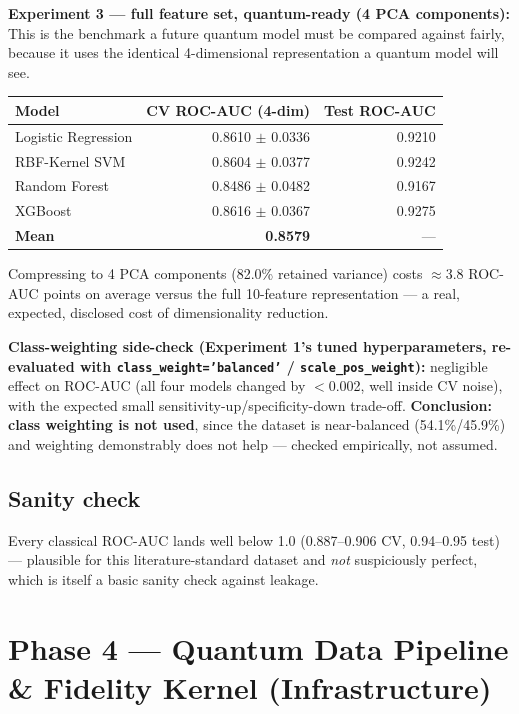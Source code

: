 \documentclass[11pt,a4paper]{article}
\newcommand{\code}[1]{\texttt{\small #1}}
\begin{document}
\textbf{Experiment 3 --- full feature set, quantum-ready (4 PCA components):} This is the benchmark a future quantum model must be compared against fairly, because it uses the identical 4-dimensional representation a quantum model will see.
\begin{center}
\begin{tabular}{@{}lrr@{}}
\toprule
\textbf{Model} & \textbf{CV ROC-AUC (4-dim)} & \textbf{Test ROC-AUC} \\
\midrule
Logistic Regression & 0.8610 $\pm$ 0.0336 & 0.9210 \\
RBF-Kernel SVM & 0.8604 $\pm$ 0.0377 & 0.9242 \\
Random Forest & 0.8486 $\pm$ 0.0482 & 0.9167 \\
XGBoost & 0.8616 $\pm$ 0.0367 & 0.9275 \\
\midrule
\textbf{Mean} & \textbf{0.8579} & --- \\
\bottomrule
\end{tabular}
\end{center}
Compressing to 4 PCA components (82.0\% retained variance) costs $\approx$3.8 ROC-AUC points on average versus the full 10-feature representation --- a real, expected, disclosed cost of dimensionality reduction.

\textbf{Class-weighting side-check (Experiment 1's tuned hyperparameters, re-evaluated with \code{class\_weight='balanced'} / \code{scale\_pos\_weight}):} negligible effect on ROC-AUC (all four models changed by $<$0.002, well inside CV noise), with the expected small sensitivity-up/specificity-down trade-off. \textbf{Conclusion: class weighting is not used}, since the dataset is near-balanced (54.1\%/45.9\%) and weighting demonstrably does not help --- checked empirically, not assumed.

\subsection{Sanity check}
Every classical ROC-AUC lands well below 1.0 (0.887--0.906 CV, 0.94--0.95 test) --- plausible for this literature-standard dataset and \emph{not} suspiciously perfect, which is itself a basic sanity check against leakage.

\section{Phase 4 --- Quantum Data Pipeline \& Fidelity Kernel (Infrastructure)}
\label{sec:phase4}
\end{document}
